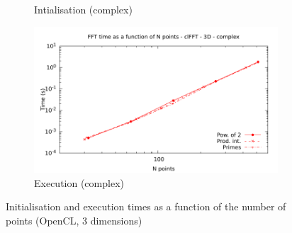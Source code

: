 \documentclass[12pt, a4paper]{article}
\begin{document}
\begin{figure}[H]
\begin{subfigure}{.5\textwidth}
\caption{Intialisation (complex)}
\label{FFTCL3DCI}
\end{subfigure}%
\begin{subfigure}{.5\textwidth}
\centering
\includegraphics[width=.9\linewidth]{graphs/fft-opencl-3d-pow2-c-exec.pdf}
\caption{Execution (complex)}
\label{FFTCL3DCE}
\end{subfigure}
\caption{Initialisation and execution times as a function of the number of points (OpenCL, 3 dimensions)}
\label{FFTCL3D}
\end{figure}
\end{document}
